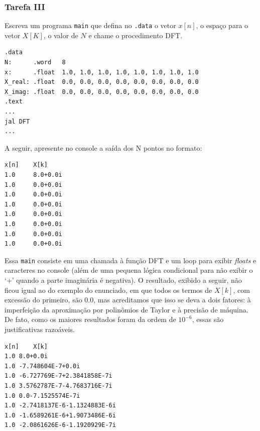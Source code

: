 \documentclass[a4paper,12pt]{article}
\newcommand{\cod}[1]{\texttt{#1}}
\newenvironment{code}{\captionsetup{type=listing}}{}
\begin{document}
\subsubsection{Tarefa III}
\begin{tcolorbox}[title=Enunciado, colback=blue!5!white, colframe=blue!75!black, breakable=true]
Escreva um programa \cod{main} que defina no \cod{.data} o vetor $x[n]$, o espaço para o vetor $X[K]$, o valor de $N$ e chame o procedimento DFT.
\begin{code}
    \begin{verbatim}
.data 
N:      .word   8  
x:      .float  1.0, 1.0, 1.0, 1.0, 1.0, 1.0, 1.0, 1.0 
X_real: .float  0.0, 0.0, 0.0, 0.0, 0.0, 0.0, 0.0, 0.0 
X_imag: .float  0.0, 0.0, 0.0, 0.0, 0.0, 0.0, 0.0, 0.0 
.text 
...
jal DFT 
... 
    \end{verbatim}
\end{code}
A seguir, apresente no console a saída dos N pontos no formato: 
\begin{verbatim}
x[n]    X[k] 
1.0     8.0+0.0i      
1.0     0.0+0.0i 
1.0     0.0+0.0i 
1.0     0.0+0.0i 
1.0     0.0+0.0i 
1.0     0.0+0.0i 
1.0     0.0+0.0i 
1.0     0.0+0.0i 
\end{verbatim}
\end{tcolorbox}

Essa \cod{main} consiste em uma chamada à função DFT e um loop para exibir \textit{floats} e caracteres no console (além de uma pequena lógica condicional para não exibir o `+' quando a parte imaginária é negativa). O resultado, exibido a seguir, não ficou igual ao do exemplo do enunciado, em que todos os termos de $X[k]$, com excessão do primeiro, são $0.0$, mas acreditamos que isso se deva a dois fatores: à imperfeição da aproximação por polinômios de Taylor e à precisão de máquina. De fato, como os maiores resultados foram da ordem de $10^{-6}$, essas são justificativas razoáveis.

\begin{tcolorbox}[colback=blue!5!white, colframe=blue!75!black, boxrule=0.5pt, arc=2pt, left=4pt, right=4pt, top=4pt, bottom=4pt, width=0.4\textwidth, center]
\begin{verbatim}
x[n]	X[k]
1.0	8.0+0.0i
1.0	-7.748604E-7+0.0i
1.0	-6.727769E-7+2.3841858E-7i
1.0	3.5762787E-7-4.7683716E-7i
1.0	0.0-7.1525574E-7i
1.0	-2.7418137E-6-1.1324883E-6i
1.0	-1.6589261E-6+1.9073486E-6i
1.0	-2.0861626E-6-1.1920929E-7i
\end{verbatim}
\end{tcolorbox}
\end{document}
